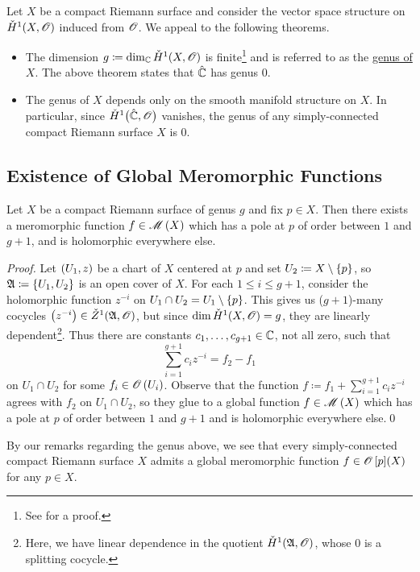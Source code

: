 \documentclass[../Moduli_Spaces_of_Riemann_Surfaces.tex]{subfiles}
\begin{document}
    \begin{remark}
        Let $X$ be a compact Riemann surface and consider the vector space structure on $\check{H}^1\!\left(X,\mathscr{O}\right)$ induced from $\mathscr{O}$. We appeal to the following theorems.
        \begin{itemize}
            \item The dimension $g\coloneqq\dim_{\mathbb{C}}\check{H}^1\!\left(X,\mathscr{O}\right)$ is finite\footnote{See \cite[][Section 14]{forster} for a proof.} and is referred to as the \ul{genus of $X$}. The above theorem states that $\hat{\mathbb{C}}$ has genus $0$.
                \vspace{-0.05in}
            \item The genus of $X$ depends only on the smooth manifold structure on $X$. In particular, since $\check{H}^1\big(\hat{\mathbb{C}},\mathscr{O}\big)$ vanishes, the genus of any simply-connected compact Riemann surface $X$ is $0$.\exqed
        \end{itemize}
    \end{remark}
    \subsection{Existence of Global Meromorphic Functions}
    \begin{theorem}\label{CC:thm:global_meromorphic_functions}
        Let $X$ be a compact Riemann surface of genus $g$ and fix $p\in X$. Then there exists a meromorphic function $f\in\mathscr{M}\left(X\right)$ which has a pole at $p$ of order between $1$ and $g+1$, and is holomorphic everywhere else.
    \end{theorem}
    \begin{proof}
        Let $\left(U_1,z\right)$ be a chart of $X$ centered at $p$ and set $U_2\coloneqq X\setminus\left\{p\right\}$, so $\mathfrak{A}\coloneqq\left\{U_1,U_2\right\}$ is an open cover of $X$. For each $1\leq i\leq g+1$, consider the holomorphic function $z^{-i}$ on $U_1\cap U_2=U_1\setminus\left\{p\right\}$. This gives us ($g+1$)-many cocycles $\left(z^{-i}\right)\in\check{Z}^1\!\left(\mathfrak{A},\mathscr{O}\right)$, but since $\dim\check{H}^1\!\left(X,\mathscr{O}\right)=g$, they are linearly dependent\footnote{Here, we have linear dependence in the quotient $\check{H}^1\!\left(\mathfrak{A},\mathscr{O}\right)$, whose $0$ is a splitting cocycle.}. Thus there are constants $c_1,\dots,c_{g+1}\in\mathbb{C}$, not all zero, such that
        \begin{equation*}
            \sum_{i=1}^{g+1}c_iz^{-i}=f_2-f_1
        \end{equation*}
        on $U_1\cap U_2$ for some $f_i\in\mathscr{O}\left(U_i\right)$. Observe that the function $f\coloneqq f_1+\sum_{i=1}^{g+1}c_iz^{-i}$ agrees with $f_2$ on $U_1\cap U_2$, so they glue to a global function $f\in\mathscr{M}\left(X\right)$ which has a pole at $p$ of order between $1$ and $g+1$ and is holomorphic everywhere else.\qed
    \end{proof}
    \begin{remark}
        By our remarks regarding the genus above, we see that every simply-connected compact Riemann surface $X$ admits a global meromorphic function $f\in\mathscr{O}\left[p\right]\!\left(X\right)$ for any $p\in X$.\exqed
    \end{remark}
\end{document}
